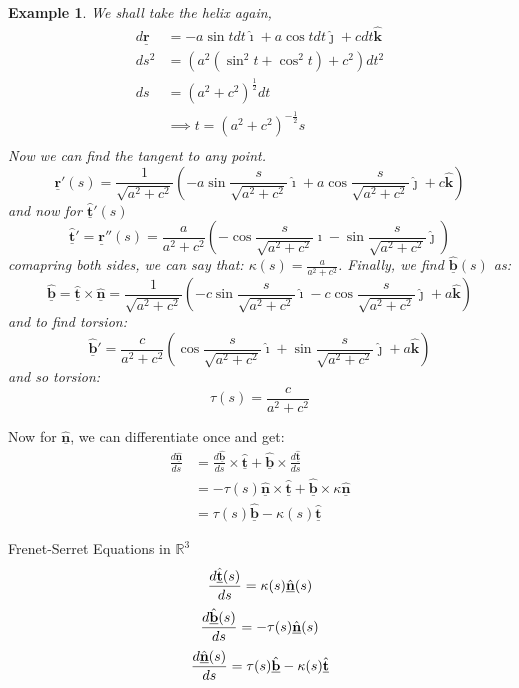 \documentclass{article}
\newcommand{\R}{\mathbb{R}}
\renewcommand{\vec}[1]{\underline{\textbf{#1}}}
\newcommand{\uvec}[1]{\hat{\underline{\textbf{#1}}}}
\newcommand{\veci}{\bm{\hat{\imath}}}
\newcommand{\vecj}{\bm{\hat{\jmath}}}
\newcommand{\veck}{\bm{\hat{k}}}
\renewcommand{\k}{\kappa}
\newcommand{\fd}[2]{\frac{d #1}{d #2}}
\newtheorem{example}{Example}
\begin{document}
\begin{example}{
 We shall take the helix again,
 \begin{align*}
   d\vec r &= -a\sin t dt\veci + a\cos t dt\vecj + c dt\veck\\
   ds ^2 &= (a^2 (\sin^2 t + \cos^2 t) + c^2) dt^2 \\
   ds &= (a^2 + c^2)^{\frac{1}{2}}dt  \\
   &\implies t = (a^2 + c^2)^{-\frac{1}{2}}s\\
 \end{align*}
  Now we can find the tangent to any point.
  $$ \vec r'(s) = \frac{1}{\sqrt{a^2 + c^2}}\left( -a\sin{\frac{s}{\sqrt{a^2 + c^2}}}\veci + a\cos{\frac{s}{\sqrt{a^2 + c^2}}}\vecj + c\veck\right) $$
  and now for $\uvec t'(s)$
  $$ \uvec t' = \vec r''(s) = \frac{a}{{a^2 + c^2}}\left( -\cos{\frac{s}{\sqrt{a^2 + c^2}}}\veci - \sin{\frac{s}{\sqrt{a^2 + c^2}}}\vecj \right) $$
  comapring both sides, we can say that: $\displaystyle{\k(s) = \frac{a}{a^2 + c^2}}$. Finally, we find $\uvec b(s)$ as:
  $$ \uvec b = \uvec t\times\uvec n = \frac{1}{\sqrt{a^2 + c^2}}\left( -c\sin{\frac{s}{\sqrt{a^2 + c^2}}}\veci - c\cos{\frac{s}{\sqrt{a^2 + c^2}}}\vecj + a\veck\right) $$
  and to find torsion:
  $$ \uvec b' = \frac{c}{{a^2 + c^2}}\left( \cos{\frac{s}{\sqrt{a^2 + c^2}}}\veci + \sin{\frac{s}{\sqrt{a^2 + c^2}}}\vecj + a\veck\right) $$
  and so torsion:
  $$ \tau(s) = \frac{c}{a^2 + c^2} $$
}\end{example}
Now for $\uvec n$, we can differentiate once and get:
\begin{align*}
  \fd{\uvec n}{s} &= \fd{\uvec b}{s}\times\uvec t + \uvec b\times \fd{\uvec t}{s} \\
  &= -\tau(s)\uvec n\times \uvec t + \uvec b\times\k\uvec n \\
  &= \tau(s)\uvec b - \k(s)\uvec t
\end{align*}

\noindent\begin{definition}{Frenet-Serret Equations in $\R^3$}{}
  \begin{equation*}
      \fd{\uvec t(s)}{s} = \k(s)\uvec n(s)\\
    \end{equation*}
    \begin{equation*}
      \fd{\uvec b(s)}{s} = -\tau(s)\uvec n(s)\\
      \end{equation*}
      \begin{equation*}
      \fd{\uvec n(s)}{s} = \tau(s)\uvec b - \k(s)\uvec t\\
  \end{equation*}
\end{definition}\vspace{10pt}
\end{document}
